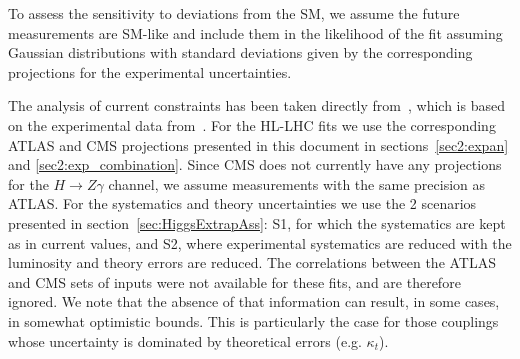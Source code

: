 To assess the sensitivity to deviations from the SM, we assume the future measurements are SM-like and include them in the likelihood of the fit assuming Gaussian distributions with standard deviations given by the corresponding projections for the experimental uncertainties. 

The analysis of current constraints has been taken directly from~\cite{deBlas:2018tjm}, which is based on the experimental data from~\cite{Aaltonen:2013ipa,Abazov:2013gmz,Chatrchyan:2013iaa,Chatrchyan:2013vaa,Chatrchyan:2013zna,Aad:2014eha,Aad:2014eva,Aad:2014xzb,ATLAS:2014aga,Chatrchyan:2014nva,Khachatryan:2014ira,Khachatryan:2014jba,Khachatryan:2014qaa,Aad:2015gba,Aad:2015gra,Aad:2015ona,Aad:2015vsa,ATLAS:2016gld,CMS:2016mmc,Khachatryan:2016vau,Aaboud:2017jvq,Aaboud:2017ojs,Aaboud:2017rss,Aaboud:2017uhw,Aaboud:2017vzb,Aaboud:2017xsd,CMS:2017rli,CMS-PAS-HIG-17-007,CMS-PAS-HIG-17-019,Sirunyan:2017elk,Sirunyan:2017exp,Sirunyan:2017khh,Aaboud:2018xdt,ATLAS-CONF-2018-004,Sirunyan:2018egh,Sirunyan:2018mvw,Sirunyan:2018shy,Sirunyan:2018ygk}. 
For the HL-LHC fits we use the corresponding ATLAS and CMS projections presented in this document in sections~\ref{sec2:expan} and \ref{sec2:exp_combination}.  
Since CMS does not currently have any projections
for the $H\to Z\gamma$ channel, we assume measurements with
the same precision as ATLAS.
For the systematics and theory uncertainties we use the 2 scenarios presented in section~\ref{sec:HiggsExtrapAss}: S1, for which the systematics are kept as in current values, and S2, where experimental systematics are reduced with the luminosity and theory errors are reduced.
%
The correlations between the ATLAS and CMS sets of inputs were not available for these fits, and are therefore ignored. We note that the absence of that information can result, in some cases, in somewhat optimistic bounds. This is particularly the case for those couplings whose uncertainty is dominated by theoretical errors (e.g. $\kappa_t$).


